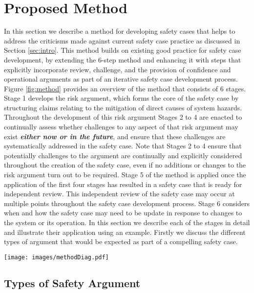 \section{Proposed Method}
\label{sec:method}

In this section we describe a method for developing safety cases that helps to address the criticisms made against current safety case practice as discussed in Section \ref{sec:intro}. This method builds on existing good practice for safety case development, by extending the 6-step method and enhancing it with steps that explicitly incorporate review, challenge, and the provision of confidence and operational arguments as part of an iterative safety case development process. Figure \ref{fig:method} provides an overview of the method that consists of 6 stages. Stage 1 develops the risk argument, which forms the core of the safety case by structuring claims relating to the mitigation of direct causes of system hazards. Throughout the development of this risk argument Stages 2 to 4 are enacted to continually assess whether challenges to any aspect of that risk argument may exist \textit{\textbf{either now or in the future}}, and ensure that these challenges are systematically addressed in the safety case. Note that Stages 2 to 4 ensure that potentially challenges to the argument are continually and explicitly considered throughout the creation of the safety case, even if no additions or changes to the risk argument turn out to be required. Stage 5 of the method is applied once the application of the first four stages has resulted in a safety case that is ready for independent review. This independent review of the safety case may occur at multiple points throughout the safety case development process. Stage 6 considers when and how the safety case may need to be update in response to changes to the system or its operation. In this section we describe each of the stages in detail and illustrate their application using an example. Firstly we discuss the different types of argument that would be expected as part of a compelling safety case.

\begin{figure*}
\texttt{[image: images/methodDiag.pdf]}
\caption{An overview of the new method for safety case development.}
\label{fig:method}
\end{figure*}

\subsection{Types of Safety Argument}

